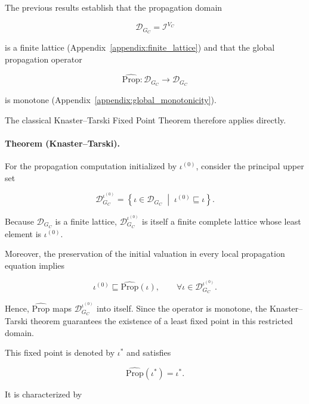 \documentclass[10pt]{article}
\begin{document}
The previous results establish that the propagation domain

\[
\mathcal D_{G_C}
=
\mathcal I^{V_C}
\]

is a finite lattice (Appendix~\ref{appendix:finite_lattice}) and that the global propagation operator

\[
\widehat{\mathrm{Prop}}
:
\mathcal D_{G_C}
\rightarrow
\mathcal D_{G_C}
\]

is monotone (Appendix~\ref{appendix:global_monotonicity}).

The classical Knaster--Tarski Fixed Point Theorem therefore applies directly.

\paragraph{Theorem (Knaster--Tarski).}
For the propagation computation initialized by $\iota^{(0)}$, consider the
principal upper set

\begin{equation}
	\mathcal D_{G_C}^{\iota^{(0)}}
	=
	\left\{
	\iota\in\mathcal D_{G_C}
	\;\middle|\;
	\iota^{(0)}
	\sqsubseteq
	\iota
	\right\}.
	\label{eq:initial_upper_domain}
\end{equation}

Because $\mathcal D_{G_C}$ is a finite lattice,
$\mathcal D_{G_C}^{\iota^{(0)}}$ is itself a finite complete lattice whose least element is $\iota^{(0)}$.

Moreover, the preservation of the initial valuation in every local propagation equation implies

\begin{equation}
	\iota^{(0)}
	\sqsubseteq
	\widehat{\mathrm{Prop}}(\iota),
	\qquad
	\forall
	\iota
	\in
	\mathcal D_{G_C}^{\iota^{(0)}}.
	\label{eq:operator_preserves_initial_domain}
\end{equation}

Hence,
$\widehat{\mathrm{Prop}}$ maps
$\mathcal D_{G_C}^{\iota^{(0)}}$ into itself. Since the operator is monotone, the Knaster--Tarski theorem guarantees the existence of a least fixed point in this restricted domain.

This fixed point is denoted by $\iota^{*}$ and satisfies

\begin{equation}
	\widehat{\mathrm{Prop}}
	\left(
	\iota^{*}
	\right)
	=
	\iota^{*}.
	\label{eq:least_fixed_point_above_initial}
\end{equation}

It is characterized by
\end{document}

